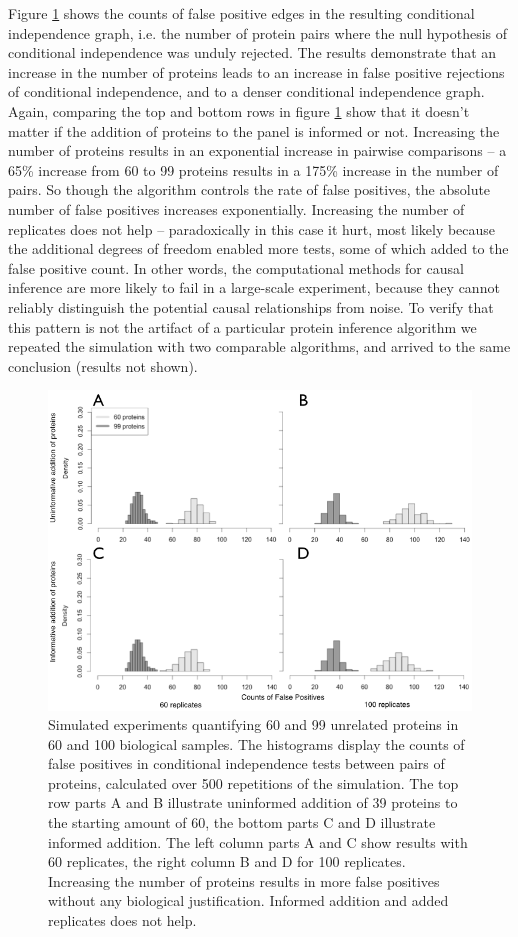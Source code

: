 \documentclass[journal=jacsat,manuscript=article]{achemso}
\def\added#1{{\color{blue} #1}}
\begin{document}
Figure \ref{spur_dep} shows the counts of false positive edges in the resulting conditional independence graph, i.e. the number of protein pairs \added{where the null hypothesis of conditional independence was unduly rejected}.  The results demonstrate that an increase in the number of proteins leads to an increase in false positive rejections of conditional independence, and to a denser conditional independence graph.  \added{Again, comparing the top and bottom rows in figure \ref{spur_dep} show that it doesn't matter if the addition of proteins to the panel is informed or not. Increasing the number of proteins results in an exponential increase in pairwise comparisons -- a 65\% increase from 60 to 99 proteins results in a 175\% increase in the number of pairs.  So though the algorithm controls the rate of false positives, the absolute number of false positives increases exponentially.  Increasing the number of replicates does not help -- paradoxically in this case it hurt, most likely because the additional degrees of freedom enabled more tests, some of which added to the false positive count.} In other words, the computational methods for causal inference are more likely to fail in a large-scale experiment, because they cannot reliably distinguish the potential causal relationships from noise.  \added{ To verify that this pattern is not the artifact of a particular protein inference algorithm we repeated the simulation with two comparable algorithms\cite{tsamardinos2003algorithms,yaramakala2005speculative}, and arrived to the same conclusion (results not shown).}

\begin{figure}[!tpb]
\centerline{\includegraphics[width=.8\textwidth]{figs/spurious_dep.png}}
\caption{Simulated experiments quantifying 60 and 99 unrelated proteins in 60 and 100 biological samples. The histograms display the counts of false positives in conditional independence tests between pairs of proteins, calculated over 500 repetitions of the simulation. The top row parts A and B illustrate uninformed addition of 39 proteins to the starting amount of 60, the bottom parts C and D illustrate informed addition.  The left column parts A and C show results with 60 replicates, the right column B and D for 100 replicates.  Increasing the number of proteins results in more false positives without any biological justification.  Informed addition and added replicates does not help.}
\label{spur_dep}
\end{figure}
\end{document}
